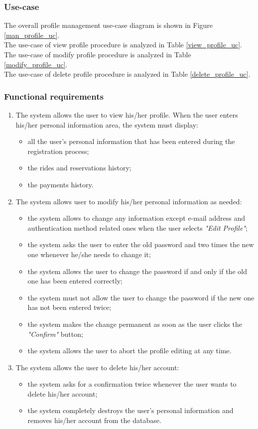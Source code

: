 \subsubsection{Use-case}
The overall profile management use-case diagram is shown in Figure \ref{man_profile_uc}. \\
The use-case of view profile procedure is analyzed in Table \ref{view_profile_uc}. \\
The use-case of modify profile procedure is analyzed in Table \ref{modify_profile_uc}. \\
The use-case of delete profile procedure is analyzed in Table \ref{delete_profile_uc}.

\subsubsection{Functional requirements}
\begin{enumerate}
\item The system allows the user to view his/her profile. When the user enters his/her personal information area, the system must display:
	\begin{itemize}
	\item all the user's personal information that has been entered during the registration process;
	\item the rides and reservations history;
	\item the payments history.
	\end{itemize}
\item The system allows user to modify his/her personal information as needed:
	\begin{itemize}
	\item the system allows to change any information except e-mail address and authentication method related ones when the user selects \emph{"Edit Profile"};
	\item the system asks the user to enter the old password and two times the new one whenever he/she needs to change it;
	\item the system allows the user to change the password if and only if the old one has been entered correctly;
	\item the system must not allow the user to change the password if the new one has not been entered twice;
	\item the system makes the change permanent as soon as the user clicks the \emph{"Confirm"} button;
	\item the system allows the user to abort the profile editing at any time.
	\end{itemize}
\item The system allows the user to delete his/her account:
	\begin{itemize}
	\item the system asks for a confirmation twice whenever the user wants to delete his/her account;
	\item the system completely destroys the user's personal information and removes his/her account from the database.
	\end{itemize}
\end{enumerate}

